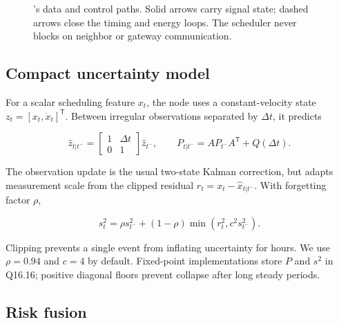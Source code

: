 \begin{figure}[t]
{
  }
  \caption{\system's data and control paths.  Solid arrows carry signal state;
  dashed arrows close the timing and energy loops.  The scheduler never blocks
  on neighbor or gateway communication.}
  \label{fig:architecture}
\end{figure}

\subsection{Compact uncertainty model}

For a scalar scheduling feature $x_t$, the node uses a constant-velocity state
$z_t=[x_t,\dot{x}_t]^\mathsf{T}$.  Between irregular observations separated by
$\Delta t$, it predicts

\begin{equation}
\hat{z}_{t|t^-}=
\begin{bmatrix}1&\Delta t\\0&1\end{bmatrix}\hat{z}_{t^-},\qquad
P_{t|t^-}=A P_{t^-}A^\mathsf{T}+Q(\Delta t).
\end{equation}

The observation update is the usual two-state Kalman correction, but \system
adapts measurement scale from the clipped residual
$r_t=x_t-\hat{x}_{t|t^-}$.  With forgetting factor $\rho$,

\begin{equation}
\label{eq:residual}
  s_t^2=\rho s_{t^-}^2+(1-\rho)\min(r_t^2,c^2s_{t^-}^2).
\end{equation}

Clipping prevents a single event from inflating uncertainty for hours.  We use
$\rho=0.94$ and $c=4$ by default.  Fixed-point implementations store $P$ and
$s^2$ in Q16.16; positive diagonal floors prevent collapse after long steady
periods.

\subsection{Risk fusion}

